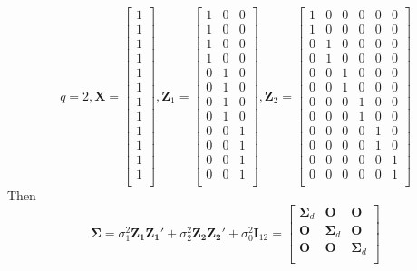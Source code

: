 	\[
	q = 2,  \bm X = \left[
	\begin{array}{c}
	1\\
	1\\
	1\\
	1\\
	1\\
	1\\
	1\\
	1\\
	1\\
	1\\
	1\\
	1\\
	\end{array}
	\right],
	\bm Z_1=\left[
	\begin{array}{ccc}
	1 & 0 & 0 \\
	1 & 0 & 0 \\
	1 & 0 & 0 \\
	1 & 0 & 0 \\
	0 & 1 & 0 \\
	0 & 1 & 0 \\
	0 & 1 & 0 \\
	0 & 1 & 0 \\
	0 & 0 & 1 \\
	0 & 0 & 1 \\
	0 & 0 & 1 \\
	0 & 0 & 1 \\
	\end{array}
	\right],
	\bm Z_2=\left[
	\begin{array}{cccccc}
	1 & 0 & 0  & 0 & 0  &0\\
	1 & 0 & 0  & 0 & 0  &0\\
	0 & 1 & 0  & 0 & 0  &0\\
	0 & 1 & 0  & 0 & 0  &0\\
	0 & 0 & 1  & 0 & 0  &0\\
	0 & 0 & 1  & 0 & 0  &0\\
	0 & 0 & 0  & 1 & 0  &0\\
	0 & 0 & 0  & 1 & 0  &0\\
	0 & 0 & 0  & 0 & 1  &0\\
	0 & 0 & 0  & 0 & 1  &0\\
	0 & 0 & 0  & 0 & 0  &1\\
	0 & 0 & 0  & 0 & 0  &1\\
	\end{array}
	\right]
	\]
	Then 
	\[\bm\Sigma = \sigma_1^2\bm{Z_1Z_1'} + \sigma_2^2\bm{Z_2Z_2'} + \sigma_0^2\bm I_{12}=
	\left[
	\begin{array}{ccc}
	\bm\Sigma_d  & \bm O  &\bm O\\
	\bm O & \bm\Sigma_d  & \bm O \\
	\bm O  &\bm O   & \bm\Sigma_d\\
	\end{array}
	\right]\]
